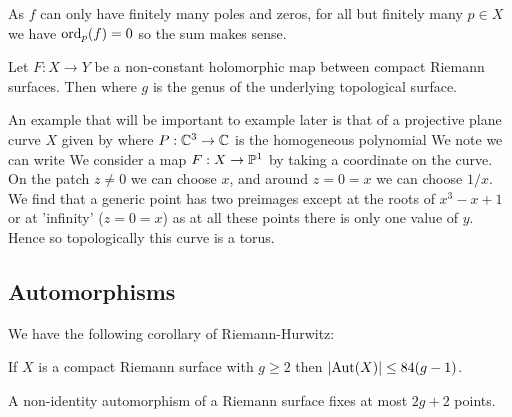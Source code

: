 \documentclass{article}
\begin{document}
\begin{remark}
	As $f$ can only have finitely many poles and zeros, for all but finitely many $p \in X$ we have $\operatorname{ord}_p(f) = 0$ so the sum makes sense. 
\end{remark}

\begin{theorem}
	Let $F:X \to Y$ be a non-constant holomorphic map between compact Riemann surfaces. Then 
	where $g$ is the genus of the underlying topological surface. 
\end{theorem}

\begin{example}
	An example that will be important to example later is that of a projective plane curve $X$ given by 
	where $P: \mathbb{C}^3 \to \mathbb{C}$ is the homogeneous polynomial 
	We note we can write 
	We consider a map $F:X \to \mathbb{P}^1$ by taking a coordinate on the curve. On the patch $z \neq 0$ we can choose $x$, and around $z=0=x$ we can choose $1/x$. We find that a generic point has two preimages except at the roots of $x^3-x+1$ or at 'infinity' ($z=0=x$) as at all these points there is only one value of $y$. Hence 
	so topologically this curve is a torus.
\end{example}
\subsection{Automorphisms}

We have the following corollary of Riemann-Hurwitz:

\begin{theorem}
	If $X$ is a compact Riemann surface with $g\geq 2$ then $\left\lvert \operatorname{Aut}(X) \right\rvert \leq 84(g-1)$. 
\end{theorem}

\begin{theorem}
	A non-identity automorphism of a Riemann surface fixes at most $2g+2$ points. 
\end{theorem}
\end{document}
